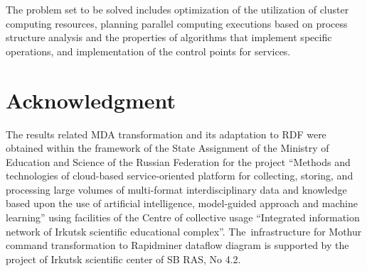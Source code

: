 \documentclass[a4paper]{jpconf}
\begin{document}
The problem set to be solved includes optimization of the utilization of cluster computing resources, planning parallel computing executions based on process structure analysis and the properties of algorithms that implement specific operations, and implementation of the control points for services.

\section*{Acknowledgment}
The results related MDA transformation and its adaptation to RDF were obtained within the framework of the State Assignment of the Ministry of Education and Science of the Russian Federation for the project ``Methods and technologies of cloud-based service-oriented platform for collecting, storing, and processing large volumes of multi-format interdisciplinary data and knowledge based upon the use of artificial intelligence, model-guided approach and machine learning'' using facilities of the Centre of collective usage ``Integrated information network of Irkutsk scientific educational complex''. The~infrastructure  for Mothur command transformation to Rapidminer dataflow diagram is supported by the project of Irkutsk scientific center of SB RAS, No 4.2.






\end{document}
